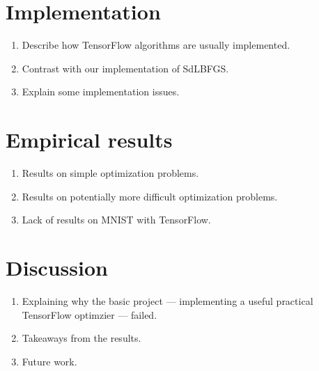 \documentclass{article}
\begin{document}
\section{Implementation}


\begin{enumerate}
  \item Describe how TensorFlow algorithms are usually implemented.
  \item Contrast with our implementation of SdLBFGS.
  \item Explain some implementation issues.
\end{enumerate}


\section{Empirical results}


\begin{enumerate}
  \item Results on simple optimization problems. 
  \item Results on potentially more difficult optimization problems.
  \item Lack of results on MNIST with TensorFlow.
\end{enumerate}


\section{Discussion}


\begin{enumerate}
  \item Explaining why the basic project --- implementing a useful practical
    TensorFlow optimzier --- failed.
  \item Takeaways from the results.
  \item Future work.
\end{enumerate}


\printbibliography[heading=bibintoc]
\end{document}

